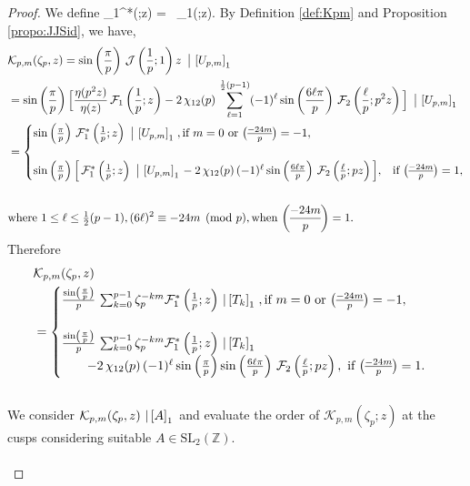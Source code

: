 \documentclass[12pt]{amsart}
\theoremstyle{definition}
\theoremstyle{remark}
\numberwithin{equation}{section}
\newcommand{\SL}{\mbox{SL}}
\newcommand\leg[2]{\genfrac{(}{)}{}{}{#1}{#2}} %
\newcommand\Lpar[1]{\left(#1\right)}
\newcommand\Fell[4]{\mathcal{F}_{#1}\left(\frac{#2}{#3};#4\right)}
\newcommand\SFell[4]{\mathcal{F}_{#1}^{*}\left(\frac{#2}{#3};#4\right)}
\newcommand\Jpz[1]{\mathcal{J}\left(\frac{1}{p};{#1}\right)}
\newcommand\stroke[3]{#1\,\left\arrowvert\,\left[#2\right]_{#3}\right.}
\newcommand\propo[1]{\ref{propo:#1}}
\newcommand\refdef[1]{\ref{def:#1}}
\begin{document}
\begin{proof}
We define
\beq
\SFell{1}{1}{p}{z} = \, \Fell{1}{1}{p}{z}.
\label{eq:SFelldef}
\eeq
By Definition \refdef{Kpm} and Proposition \propo{JJSid}, we have,
\begin{align*}
&\mathcal{K}_{p,m}(\zeta_p,z) 
=  \sin\Lpar{\frac{\pi}{p}} \, 
\stroke{\Jpz{1}{z}}{U_{p,m}}{1}
\\
&=\sin\Lpar{\frac{\pi}{p}} \Big[ \frac{\eta(p^2 z)}{\eta(z)} \, \Fell{1}{1}{p}{z}
 - 
2\,\chi_{12}(p) \,
\sum_{\ell=1}^{\frac{1}{2}(p-1)} (-1)^{\ell} 
\sin\Lpar{\frac{6\ell \pi}{p}} \,
\Fell{2}{\ell}{p}{p^2 z} \stroke{\Big]}{U_{p,m}}{1}
\\
&=\begin{cases}
\sin\Lpar{\frac{\pi}{p}} \, \SFell{1}{1}{p}{z}\stroke{}{U_{p,m}}{1},  \text{if}~m=0~\text{or}~\leg{-24m}{p}=-1  , \\
\\
\sin\Lpar{\frac{\pi}{p}} \Big[  \, \SFell{1}{1}{p}{z}\stroke{}{U_{p,m}}{1}
 - 
2\,\chi_{12}(p) \,
 (-1)^{\ell} 
\sin\Lpar{\frac{6\ell \pi}{p}} \,
\Fell{2}{\ell}{p}{p z}\Big], & \text{if}~\leg{-24m}{p}=1, 
\end{cases} 
\\\\
&\text{where}~1 \le \ell \le \tfrac{1}{2}(p-1),
(6\ell)^2 \equiv -24m\pmod{p}, \text{when}~\leg{-24m}{p}=1.
\end{align*}
Therefore
\begin{align*}
& \mathcal{K}_{p,m}(\zeta_p,z)\\
&=\begin{cases}
\frac{\sin\Lpar{\frac{\pi}{p}}}{p}   \,\sum_{k=0}^{p-1} \zeta_p^{-km}  \SFell{1}{1}{p}{z}\stroke{}{T_k}{1}, \text{if}~m=0~\text{or}~\leg{-24m}{p}=-1  , \\
\\
\frac{\sin\Lpar{\frac{\pi}{p}}}{p}   \,\sum_{k=0}^{p-1} \zeta_p^{-km}  \SFell{1}{1}{p}{z}\stroke{}{T_k}{1}
\\
\qquad- 
2\,\chi_{12}(p) \,
 (-1)^{\ell} 
\sin\Lpar{\frac{\pi}{p}}
\sin\Lpar{\frac{6\ell \pi}{p}} \,
\Fell{2}{\ell}{p}{p z},~\text{if}~\leg{-24m}{p}=1.
\end{cases} 
\end{align*}
\\
We consider $\mathcal{K}_{p,m}(\zeta_p,z) \stroke{}{A}{1}$ and evaluate the order of $\mathcal{K}_{p,m}(\zeta_p;z)$ at the cusps considering suitable $A \in \SL_2(\mathbb{Z})$.
\\\\

\end{proof}
\end{document}
